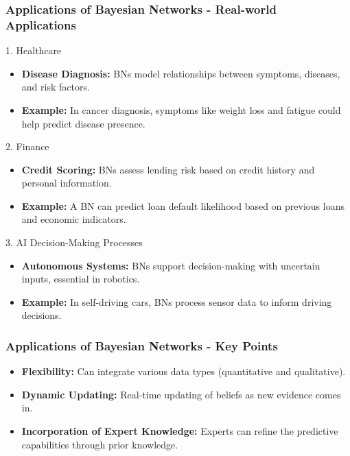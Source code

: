 \documentclass[aspectratio=169]{beamer}
\begin{document}
\begin{frame}[fragile]
  \frametitle{Applications of Bayesian Networks - Real-world Applications}
  \begin{block}{1. Healthcare}
    \begin{itemize}
      \item \textbf{Disease Diagnosis:} BNs model relationships between symptoms, diseases, and risk factors.
      \item \textbf{Example:} In cancer diagnosis, symptoms like weight loss and fatigue could help predict disease presence.
    \end{itemize}
  \end{block}

  \begin{block}{2. Finance}
    \begin{itemize}
      \item \textbf{Credit Scoring:} BNs assess lending risk based on credit history and personal information.
      \item \textbf{Example:} A BN can predict loan default likelihood based on previous loans and economic indicators.
    \end{itemize}
  \end{block}

  \begin{block}{3. AI Decision-Making Processes}
    \begin{itemize}
      \item \textbf{Autonomous Systems:} BNs support decision-making with uncertain inputs, essential in robotics.
      \item \textbf{Example:} In self-driving cars, BNs process sensor data to inform driving decisions.
    \end{itemize}
  \end{block}
\end{frame}

\begin{frame}[fragile]
  \frametitle{Applications of Bayesian Networks - Key Points}
  \begin{itemize}
    \item \textbf{Flexibility:} Can integrate various data types (quantitative and qualitative).
    \item \textbf{Dynamic Updating:} Real-time updating of beliefs as new evidence comes in.
    \item \textbf{Incorporation of Expert Knowledge:} Experts can refine the predictive capabilities through prior knowledge.
  \end{itemize}
\end{frame}
\end{document}
